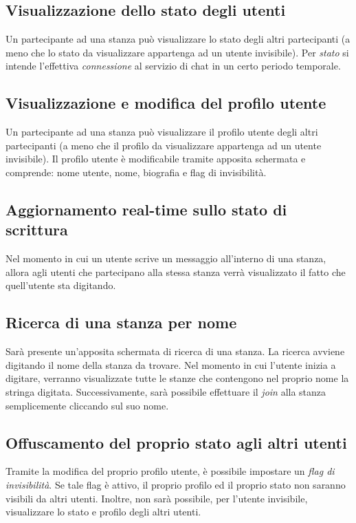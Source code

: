 \subsection{Visualizzazione dello stato degli utenti}
Un partecipante ad una stanza può visualizzare lo stato degli altri partecipanti (a meno che lo stato da visualizzare appartenga ad un utente invisibile). Per \textit{stato} si intende l'effettiva \textit{connessione} al servizio di chat in un certo periodo temporale.

\subsection{Visualizzazione e modifica del profilo utente}
Un partecipante ad una stanza può visualizzare il profilo utente degli altri partecipanti (a meno che il profilo da visualizzare appartenga ad un utente invisibile). Il profilo utente è modificabile tramite apposita schermata e comprende: nome utente, nome, biografia e flag di invisibilità. 

\subsection{Aggiornamento real-time sullo stato di scrittura}
Nel momento in cui un utente scrive un messaggio all'interno di una stanza, allora agli utenti che partecipano alla stessa stanza verrà visualizzato il fatto che quell'utente sta digitando.

\subsection{Ricerca di una stanza per nome}
Sarà presente un'apposita schermata di ricerca di una stanza. La ricerca avviene digitando il nome della stanza da trovare.
Nel momento in cui l'utente inizia a digitare, verranno visualizzate tutte le stanze che contengono nel proprio nome la stringa digitata.
Successivamente, sarà possibile effettuare il \textit{join} alla stanza semplicemente cliccando sul suo nome.

\subsection{Offuscamento del proprio stato agli altri utenti}
Tramite la modifica del proprio profilo utente, è possibile impostare un \textit{flag di invisibilità}. Se tale flag è attivo, il proprio profilo ed il proprio stato non saranno visibili da altri utenti. Inoltre, non sarà possibile, per l'utente invisibile, visualizzare lo stato e profilo degli altri utenti.

